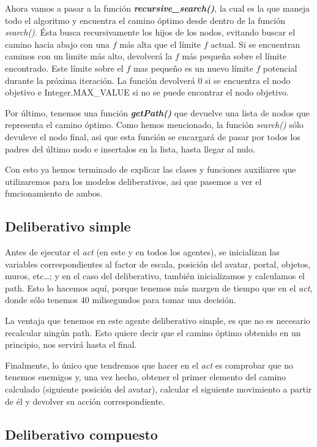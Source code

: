 \documentclass[11pt,a4paper]{article}
\begin{document}
Ahora vamos a pasar a la función \textbf{\textit{recursive\_search()}}, la cual es la que maneja todo
el algoritmo y encuentra el camino óptimo desde dentro de la función \textit{search()}. Ésta busca recursivamente
los hijos de los nodos, evitando buscar el camino hacia abajo con una $f$ más alta que el límite $f$ actual.
Si se encuentran caminos con un limite más alto, devolverá la $f$ más pequeña sobre el límite encontrado.
Este límite sobre el $f$ mas pequeño es un nuevo límite $f$ potencial durante la próxima iteración. La función
devolverá 0 si se encuentra el nodo objetivo e Integer.MAX\_VALUE si no se puede encontrar el nodo objetivo.

Por último, tenemos una función \textit{\textbf{getPath()}} que devuelve una lista de nodos que representa el
camino óptimo. Como hemos mencionado, la función \textit{search()} sólo devuleve el nodo final, asi que esta
función se encargará de pasar por todos los padres del último nodo e insertalos en la lista, hasta llegar al
nulo.

Con esto ya hemos terminado de explicar las clases y funciones auxiliares que utilizaremos para los modelos
deliberativos, asi que pasemos a ver el funcionamiento de ambos.


\subsection{Deliberativo simple}

Antes de ejecutar el \textit{act} (en este y en todos los agentes), se inicializan las variables correspondientes
al factor de escala, posición del avatar, portal, objetos, muros, etc\dots; y en el caso del deliberativo, también
inicializamos y calculamos el path. Esto lo hacemos aquí, porque tenemos más margen de tiempo que en el \textit{act},
donde sólo tenemos 40 milisegundos para tomar una decisión.

La ventaja que tenemos en este agente deliberativo simple, es que no es necesario recalcular ningún path. Esto
quiere decir que el camino óptimo obtenido en un principio, nos servirá hasta el final.

Finalmente, lo único que tendremos que hacer en el \textit{act} es comprobar que no tenemos enemigos y, una 
vez hecho, obtener el primer elemento del camino calculado (siguiente posición del avatar), calcular el siguiente
movimiento a partir de él y devolver su acción correspondiente.


\subsection{Deliberativo compuesto}
\end{document}
